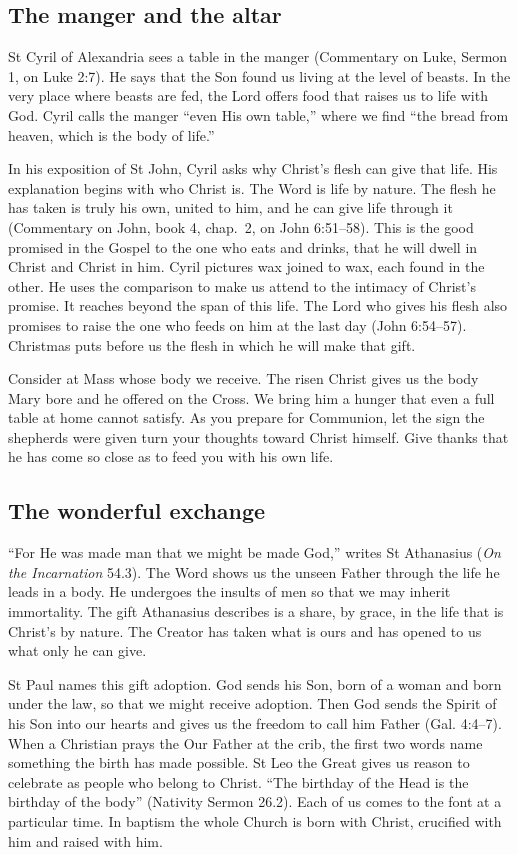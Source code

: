 \subsection{The manger and the altar}

St Cyril of Alexandria sees a table in the manger (Commentary on Luke,
Sermon 1, on Luke 2:7). He says that the Son found us living at the level
of beasts. In the very place where beasts are fed, the Lord offers food
that raises us to life with God. Cyril calls the manger “even His own
table,” where we find “the bread from heaven, which is the body of life.”

In his exposition of St John, Cyril asks why Christ's flesh can give that
life. His explanation begins with who Christ is. The Word is life by
nature. The flesh he has taken is truly his own, united to him, and he
can give life through it (Commentary on John, book 4, chap.~2, on
John 6:51--58). This is the good promised in the Gospel to the one who
eats and drinks, that he will dwell in Christ and Christ in him. Cyril
pictures wax joined to wax, each found in the other. He uses the
comparison to make us attend to the intimacy of Christ's promise. It
reaches beyond the span of this life. The Lord who gives his
flesh also promises to raise the one who feeds on him at the last day
(John 6:54--57). Christmas puts before us the flesh in which he will
make that gift.

Consider at Mass whose body we receive. The risen Christ gives us the
body Mary bore and he offered on the Cross. We bring him a hunger that
even a full table at home cannot satisfy. As you prepare for Communion,
let the sign the shepherds were given turn your thoughts toward Christ
himself. Give thanks that he has come so close as to
feed you with his own life.

\subsection{The wonderful exchange}

“For He was made man that we might be made God,” writes St Athanasius
(\emph{On the Incarnation} 54.3). The Word
shows us the unseen Father through the life he leads in a body. He
undergoes the insults of men so that we may inherit immortality. The gift
Athanasius describes is a share, by grace, in the life that is Christ's
by nature. The Creator has taken what is ours and has opened to us what
only he can give.

St Paul names this gift adoption. God sends his Son, born of a woman and
born under the law, so that we might receive adoption. Then God sends the
Spirit of his Son into our hearts and gives us the freedom to call him
Father (Gal. 4:4--7). When a Christian prays the Our Father at the crib,
the first two words name something the birth has made possible. St Leo
the Great gives us reason to celebrate as people who belong to Christ.
“The birthday of the Head is the birthday of the body” (Nativity Sermon
26.2). Each of us comes to the font at a particular time. In baptism
the whole Church is born with Christ, crucified with him and raised
with him.

